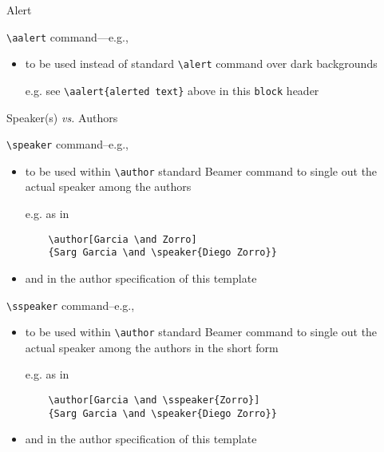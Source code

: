 \documentclass[presentation,apice]{beamer}\mode<presentation>{\usetheme{AMSBolognaFC}}
\begin{document}
\begin{frame}[c,fragile]{Alert}
%
\begin{block}{\texttt{\textbackslash{}aalert} command---e.g., }
\begin{itemize}
	\item to be used instead of standard \texttt{\textbackslash{}alert} command over dark backgrounds
	\item[e.g.] see \verb|\aalert{alerted text}| above in this \texttt{block} header
\end{itemize}
\end{block}
%
\end{frame}

\begin{frame}{Speaker(s) \emph{vs.} Authors}
%
\begin{exampleblock}{\texttt{\textbackslash{}speaker} command--e.g., }
\begin{itemize}
	\item to be used within \texttt{\textbackslash{}author} standard Beamer command to single out the actual speaker among the authors
	\item[e.g.] as in
\begin{verbatim}
	\author[Garcia \and Zorro]
	{Sarg Garcia \and \speaker{Diego Zorro}}
\end{verbatim}
	\item and in the author specification of this template
\end{itemize}
\end{exampleblock}
%
\begin{block}{\texttt{\textbackslash{}sspeaker} command--e.g., }
\begin{itemize}
	\item to be used within \texttt{\textbackslash{}author} standard Beamer command to single out the actual speaker among the authors in the short form
	\item[e.g.] as in
\begin{verbatim}
	\author[Garcia \and \sspeaker{Zorro}]
	{Sarg Garcia \and \speaker{Diego Zorro}}
\end{verbatim}
	\item and in the author specification of this template
\end{itemize}
\end{block}

\end{frame}
\end{document}
